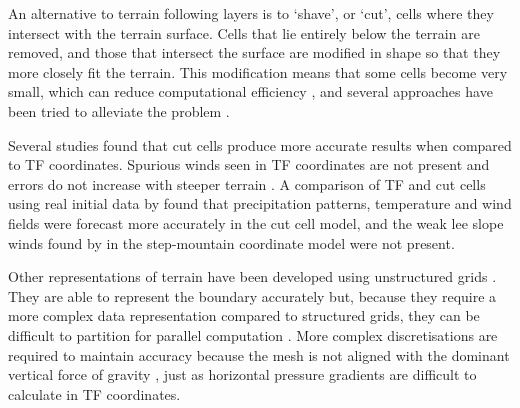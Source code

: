 An alternative to terrain following layers is to `shave', or `cut', cells where they intersect with the terrain surface.  Cells that lie entirely below the terrain are removed, and those that intersect the surface are modified in shape so that they more closely fit the terrain.  This modification means that some cells become very small, which can reduce computational efficiency \autocite{klein2009}, and several approaches have been tried to alleviate the problem \parencites{steppeler2002}{yamazaki-satomura2010}{jebens2011}.

Several studies found that cut cells produce more accurate results when compared to TF coordinates.  Spurious winds seen in TF coordinates are not present and errors do not increase with steeper terrain \autocite{good2013}.  A comparison of TF and cut cells using real initial data by \textcite{steppeler2006} found that precipitation patterns, temperature and wind fields were forecast more accurately in the cut cell model, and the weak lee slope winds found by \textcite{gallus-klemp2000} in the step-mountain coordinate model were not present.  



Other representations of terrain have been developed using unstructured grids \parencites{ss2011}{others?}.    They are able to represent the boundary accurately but, because they require a more complex data representation compared to structured grids, they can be difficult to partition for parallel computation \autocite{steppeler2003}.  More complex discretisations are required to maintain accuracy because the mesh is not aligned with the dominant vertical force of gravity \autocite{rosatti2005}, just as horizontal pressure gradients are difficult to calculate in TF coordinates.

